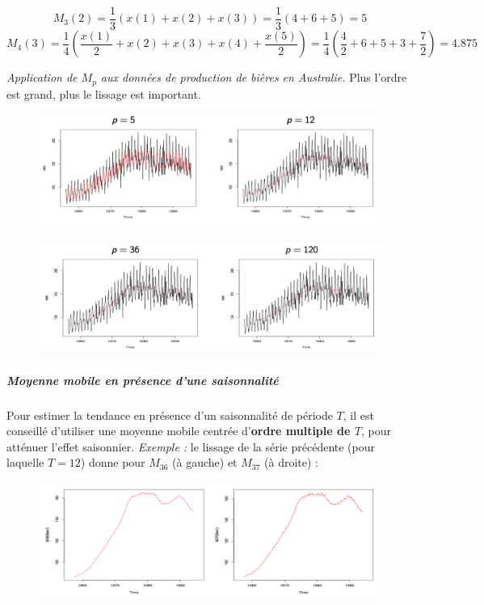 $$M_{3}(2) = \frac{1}{3}(x(1)+x(2)+x(3)) = \frac{1}{3}(4+6+5) = 5$$
$$M_{4}(3) =  \frac{1}{4}(\frac{x(1)}{2}+x(2)+x(3)+x(4)+\frac{x(5)}{2}) = \frac{1}{4}(\frac{4}{2}+6+5+3+\frac{7}{2}) = 4.875$$

\textit{Application de $M_{p}$ aux données de production de bières en Australie.}\newline
Plus l'ordre est grand, plus le lissage est important.

\begin{figure}[H]\begin{center}\includegraphics[scale=0.8]{ilu/ccm35.png}\end{center}\end{figure}
\begin{figure}[H]\begin{center}\includegraphics[scale=0.8]{ilu/ccm36.png}\end{center}\end{figure}
\subparagraph{Moyenne mobile en présence d'une saisonnalité}
Pour estimer la tendance en présence d'un saisonnalité de période $T$, il est conseillé d'utiliser une moyenne mobile centrée d'\textbf{ordre multiple de $T$}, pour atténuer l'effet saisonnier.\newline
\textit{Exemple : } le lissage de la série précédente (pour laquelle $T = 12$) donne pour $M_{36}$ (à gauche) et $M_{37}$ (à droite) :
\begin{figure}[H]\begin{center}\includegraphics[scale=0.8]{ilu/ccm37.png}\end{center}\end{figure}
